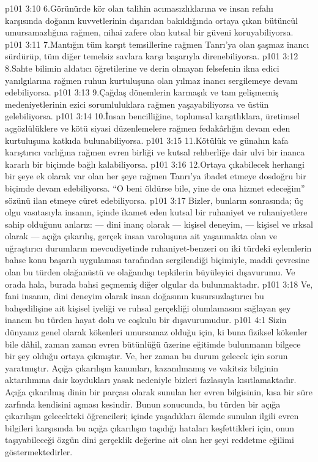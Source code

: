 \vs p101 3:10 6.\bibnobreakspace Görünürde kör olan talihin acımasızlıklarına ve insan refahı karşısında doğanın kuvvetlerinin dışarıdan bakıldığında ortaya çıkan bütüncül umursamazlığına rağmen, nihai zafere olan kutsal bir güveni koruyabiliyorsa.
\vs p101 3:11 7.\bibnobreakspace Mantığın tüm karşıt temsillerine rağmen Tanrı’ya olan şaşmaz inancı sürdürüp, tüm diğer temelsiz savlara karşı başarıyla direnebiliyorsa.
\vs p101 3:12 8.\bibnobreakspace Sahte bilimin aldatıcı öğretilerine ve derin olmayan felsefenin ikna edici yanılgılarına rağmen ruhun kurtuluşuna olan yılmaz inancı sergilemeye devam edebiliyorsa.
\vs p101 3:13 9.\bibnobreakspace Çağdaş dönemlerin karmaşık ve tam gelişmemiş medeniyetlerinin ezici sorumluluklara rağmen yaşayabiliyorsa ve üstün gelebiliyorsa.
\vs p101 3:14 10.\bibnobreakspace İnsan bencilliğine, toplumsal karşıtlıklara, üretimsel açgözlülüklere ve kötü siyasi düzenlemelere rağmen fedakârlığın devam eden kurtuluşuna katkıda bulunabiliyorsa.
\vs p101 3:15 11.\bibnobreakspace Kötülük ve günahın kafa karıştırıcı varlığına rağmen evren birliği ve kutsal rehberliğe dair ulvi bir inanca kararlı bir biçimde bağlı kalabiliyorsa.
\vs p101 3:16 12.\bibnobreakspace Ortaya çıkabilecek herhangi bir şeye ek olarak var olan her şeye rağmen Tanrı’ya ibadet etmeye dosdoğru bir biçimde devam edebiliyorsa. “O beni öldürse bile, yine de ona hizmet edeceğim” sözünü ilan etmeye cüret edebiliyorsa.
\vs p101 3:17 Bizler, bunların sonrasında; üç olgu vasıtasıyla insanın, içinde ikamet eden kutsal bir ruhaniyet ve ruhaniyetlere sahip olduğunu anlarız: --- dini inanç olarak --- kişisel deneyim, --- kişisel ve ırksal olarak --- açığa çıkarılış, gerçek insan varoluşuna ait yaşanmakta olan ve uğraştırıcı durumların mevcudiyetinde ruhaniyet\hyp{}benzeri on iki türdeki eylemlerin bahse konu başarılı uygulaması tarafından sergilendiği biçimiyle, maddi çevresine olan bu türden olağanüstü ve olağandışı tepkilerin büyüleyici dışavurumu. Ve orada hala, burada bahsi geçmemiş diğer olgular da bulunmaktadır.
\vs p101 3:18 Ve, fani insanın, dini deneyim olarak insan doğasının kusursuzlaştırıcı bu bahşedilişine ait kişisel iyeliği ve ruhsal gerçekliği olumlamasını sağlayan şey inancın bu türden hayat dolu ve coşkulu bir dışavurumudur.
\vs p101 4:1 Sizin dünyanız genel olarak kökenleri umursamaz olduğu için, ki buna fiziksel kökenler bile dâhil, zaman zaman evren bütünlüğü üzerine eğitimde bulunmanın bilgece bir şey olduğu ortaya çıkmıştır. Ve, her zaman bu durum gelecek için sorun yaratmıştır. Açığa çıkarılışın kanunları, kazanılmamış ve vakitsiz bilginin aktarılımına dair koydukları yasak nedeniyle bizleri fazlasıyla kısıtlamaktadır. Açığa çıkarılmış dinin bir parçası olarak sunulan her evren bilgisinin, kısa bir süre zarfında kendisini aşması kesindir. Bunun sonucunda, bu türden bir açığa çıkarılışın gelecekteki öğrencileri; içinde yaşadıkları âlemde sunulan ilgili evren bilgileri karşısında bu açığa çıkarılışın taşıdığı hataları keşfettikleri için, onun taşıyabileceği özgün dini gerçeklik değerine ait olan her şeyi reddetme eğilimi göstermektedirler.
